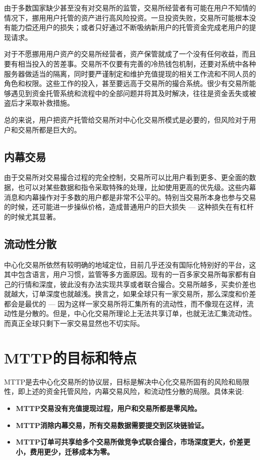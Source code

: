 \documentclass[UTF8,nofonts]{ctexart}
\begin{document}
由于多数国家缺少甚至没有对交易所的监管，交易所经营者有可能在用户不知情的情况下，挪用用户托管的资产进行高风险投资。一旦投资失败，交易所可能根本没有能力偿还用户的损失；或者只好通过不断吸纳新用户的托管资金完成老用户的提现请求。

对于不愿挪用用户资产的交易所经营者，资产保管就成了一个没有任何收益，而且要有相当投入的苦差事。交易所不仅要有完善的冷热钱包机制，还要对系统中各种服务器做适当的隔离，同时要严谨制定和维护充值提现的相关工作流和不同人员的角色和权限。这些工作的投入，甚至要远高于交易所的撮合系统。很少有交易所能够遇见到资金托管系统和流程中的全部问题并将其及时解决，往往是资金丢失或被盗后才采取补救措施。

总的来说，用户把资产托管给交易所对中心化交易所模式是必要的，但风险对于用户和交易所都是巨大的。


\subsection{内幕交易}

由于交易所对交易撮合过程的完全控制，交易所可以比用户看到更多、更全面的数据，也可以对某些数据和指令采取特殊的处理，比如使用更高的优先级。这些内幕消息和内幕操作对于多数的用户都是非常不公平的。特别当交易所本身也参与交易的时候，还可能进一步操纵价格，造成普通用户的巨大损失 --- 这种损失在有杠杆的时候尤其显著。

\subsection{流动性分散}

中心化交易所依然有较明确的地域定位，目前几乎还没有国际化特别好的平台，这其中包含语言，用户习惯，监管等多方面原因。现有的一百多家交易所每家都有自己的行情和深度，彼此没有办法实现共享或者联合撮合。交易所越多，买卖价差也就越大，订单深度也就越浅。换言之，如果全球只有一家交易所，那么深度和价差都会是最优的 --- 因为这样一家交易所将汇集所有的流动性，而不像现在这样，流动性是分散的。但是，中心化交易所理论上无法共享订单，也就无法汇集流动性。而真正全球只剩下一家交易显然也不切实际。

\section{MTTP的目标和特点}

MTTP是去中心化交易所的协议层，目标是解决中心化交易所固有的风险和局限性，即上述的资金托管风险，内幕交易风险，和流动性分散的局限。具体来说:

\begin{itemize}
	\item \textbf{MTTP交易没有充值提现过程，用户和交易所都是零风险。}
	\item \textbf{MTTP消除内幕交易，所有交易数据需要提交到区块链验证。}
	\item \textbf{MTTP订单可共享给多个交易所做竞争式联合撮合，市场深度更大，价差更小，费用更少，迁移成本为零。}
\end{itemize}
\end{document}
